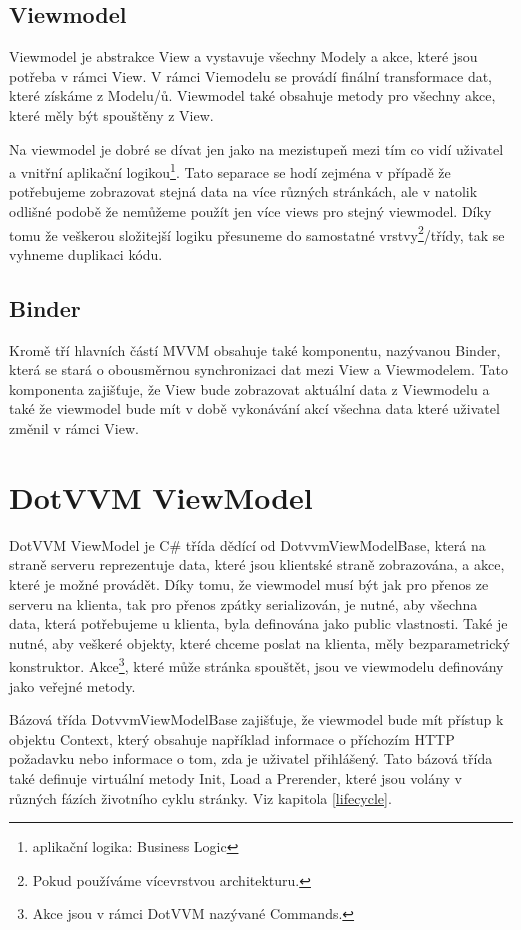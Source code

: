 \subsection*{Viewmodel}
Viewmodel je abstrakce View a vystavuje všechny Modely a akce, které jsou potřeba v rámci View. V rámci Viemodelu se provádí finální transformace dat, které získáme z Modelu/ů. Viewmodel také obsahuje metody pro všechny akce, které měly být spouštěny z View.

Na viewmodel je dobré se dívat jen jako na mezistupeň mezi tím co vidí uživatel a vnitřní aplikační logikou\footnote{aplikační logika: Business Logic}. Tato separace se hodí zejména v případě že potřebujeme zobrazovat stejná data na více různých stránkách, ale v natolik odlišné podobě že nemůžeme použít jen více views pro stejný viewmodel. Díky tomu že veškerou složitejší logiku přesuneme do samostatné vrstvy\footnote{Pokud používáme vícevrstvou architekturu.}/třídy, tak se vyhneme duplikaci kódu.
\subsection*{Binder}
Kromě tří hlavních částí MVVM obsahuje také komponentu, nazývanou Binder, která se stará o obousměrnou synchronizaci dat mezi View a Viewmodelem. Tato komponenta zajišťuje, že View bude zobrazovat aktuální data z Viewmodelu a také že viewmodel bude mít v době vykonávání akcí všechna data které uživatel změnil v rámci View.

\section{DotVVM ViewModel}

DotVVM ViewModel je C\# třída dědící od DotvvmViewModelBase, která na straně serveru reprezentuje data, které jsou klientské straně zobrazována, a akce, které je možné provádět.
Díky tomu, že viewmodel musí být jak pro přenos ze serveru na klienta, tak pro přenos zpátky serializován, je nutné, aby všechna data, která potřebujeme u klienta, byla definována jako public vlastnosti. Také je nutné, aby veškeré objekty, které chceme poslat na klienta, měly bezparametrický konstruktor.
Akce\footnote{Akce jsou v rámci DotVVM nazývané Commands.\cite{DotVVM-VM}}, které může stránka spouštět, jsou ve viewmodelu definovány jako veřejné metody.

Bázová třída DotvvmViewModelBase zajišťuje, že viewmodel bude mít přístup k objektu Context, který obsahuje například informace o příchozím HTTP požadavku nebo informace o tom, zda je uživatel přihlášený.
Tato bázová třída také definuje virtuální metody Init, Load a Prerender, které jsou volány v různých fázích životního cyklu stránky. Viz kapitola \ref{lifecycle}.

